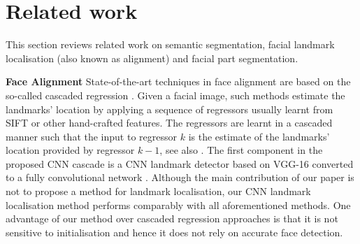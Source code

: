 \section{Related work}

This section reviews related work on semantic segmentation, facial
landmark localisation (also known as alignment) and facial part
segmentation.

\textbf{Face Alignment} State-of-the-art techniques in face alignment
are based on the so-called cascaded regression
\cite{dollar2010cascaded}. Given a facial image, such methods estimate
the landmarks' location by applying a sequence of regressors usually
learnt from SIFT \cite{lowe2004distinctive} or other hand-crafted
features. The regressors are learnt in a cascaded manner such that the
input to regressor $k$ is the estimate of the landmarks' location
provided by regressor $k-1$, see also
\cite{sanchez16,Cao2012shaperegression,xiongsupervised,zhu2015face,tzimiropoulos2015project}. The
first component in the proposed CNN cascade is a CNN landmark detector
based on VGG-16 \cite{simonyan2014vgg} converted to a fully
convolutional network \cite{long2015fully}. Although the main
contribution of our paper is not to propose a method for landmark
localisation, our CNN landmark localisation method performs comparably
with all aforementioned methods. One advantage of our method over
cascaded regression approaches is that it is not sensitive to
initialisation and hence it does not rely on accurate face detection.

